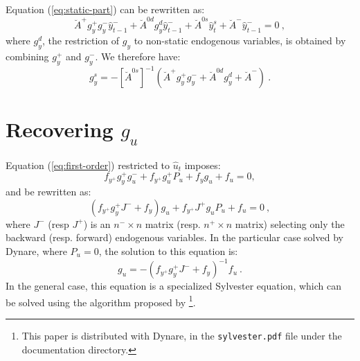 \documentclass[11pt,a4paper]{article}
\begin{document}
Equation (\ref{eq:static-part}) can be rewritten as:
\begin{equation*}
  \breve{A}^+ g^+_y g^-_y \hat{y}^-_{t-1} + \breve{A}^{0d} g^d_y \hat{y}^-_{t-1} + \breve{A}^{0s} \hat{y}^{s}_t + \breve{A}^- \hat{y}^-_{t-1} = 0 \: ,
\end{equation*}
where $g^d_y$, the restriction of $g_y$ to non-static endogenous variables, is
obtained by combining $g^+_y$ and $g^-_y$. We therefore have:
\begin{equation*}
  g^s_y = -\left[\breve{A}^{0s}\right]^{-1} \left(\breve{A}^+ g^+_y g^-_y + \breve{A}^{0d} g^d_y + \breve{A}^-\right) \: .
\end{equation*}

\section{Recovering $g_u$}
\label{sec:g-u}

Equation (\ref{eq:first-order}) restricted to $\hat{u}_t$ imposes:
\begin{equation*}
  f_{y^+} g^+_yg^-_u+ f_{y^+}g^+_u P_u + f_y g_u + f_u = 0,
\end{equation*}
and be rewritten as:
\begin{equation*}
  (f_{y^+} g^+_y J^- + f_y) g_u + f_{y^+}J^+ g_u P_u + f_u = 0 \: ,
\end{equation*}
where $J^-$ (resp $J^+$) is an $n^-\times n$ matrix (resp. $n^+\times n$
matrix) selecting only the backward (resp. forward) endogenous variables.  In
the particular case solved by Dynare, where $P_u = 0$, the solution to this
equation is:
\begin{equation*}
  g_u = -(f_{y^+} g^+_y J^- + f_y)^{-1} f_u \: .
\end{equation*}
In the general case, this equation is a specialized Sylvester equation, which
can be solved using the algorithm proposed by
\citet{kamenik:2004}\footnote{This paper is distributed with Dynare, in the
  \texttt{sylvester.pdf} file under the documentation directory.}.



\end{document}
